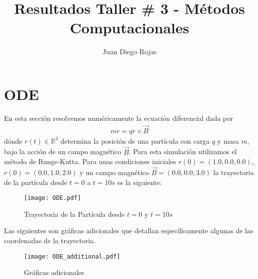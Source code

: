 \documentclass{article}
\title{Resultados Taller \# 3 - Métodos Computacionales}
\author{Juan Diego Rojas}
\begin{document}
	\maketitle
	\section{ODE}
	En esta sección resolvemos numéricamente la ecuación diferencial dada por
	\begin{align*}
		m\ddot{r} = q\dot{r}\times \vec{B}
	\end{align*}
	dónde $r(t) \in \mathbb{R}^3$ determina la posición de una partícula con carga $q$ y masa $m$, bajo la acción de un campo magnético $\vec{B}$. Para esta simulación utilizamos el método de Runge-Kutta. Para unas condiciones iniciales $r(0) = (1.0, 0.0, 0.0)$,  $\dot{r}(0) = (0.0, 1.0, 2.0)$ y un campo magnético $\vec{B} = (0.0, 0.0, 3.0)$ la trayectoria de la partícula desde $t = 0$ a $t = 10s$ es la siguiente:
	\begin{figure}[H]
		\centering
		\texttt{[image: ODE.pdf]}
		\caption{Trayectoria de la Partícula desde $t=0$ y $t=10s$}
		\label{fig:ODE}
	\end{figure}
	Las siguientes son gráficas adicionales que detallan específicamente algunas de las coordenadas de la trayectoria.
	\begin{figure}[H]
		\centering
		\texttt{[image: ODE\_additional.pdf]}
		\caption{Gráficas adicionales}
		\label{fig:ODE_additional}
	\end{figure}
\end{document}
